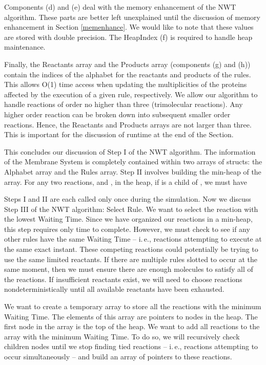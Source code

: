 \documentclass[copyright]{eptcs}
\begin{document}
Components (d) and (e) deal with the memory enhancement of the NWT algorithm.  These parts are better left unexplained until the discussion of memory enhancement in Section \ref{memenhance}.  We would like to note that these values are stored with double precision.  The HeapIndex (f) is required to handle heap maintenance.

Finally, the Reactants array and the Products array (components (g) and (h)) contain the indices of the alphabet for the reactants and products of the rules.  This allows O(1) time access when updating the multiplicities of the proteins affected by the execution of a given rule, respectively.  We allow our algorithm to handle reactions of order no higher than three (trimolecular reactions).  Any higher order reaction can be broken down into subsequent smaller order reactions.  Hence, the Reactants and Products arrays are not larger than three.  This is important for the discussion of runtime at the end of the Section.

This concludes our discussion of Step I of the NWT algorithm.  The information of the Membrane System is completely contained within two arrays of structs: the Alphabet array and the Rules array.  Step II involves building the min-heap of the array.  For any two reactions,  and , in the heap, if  is a child of , we must have


Steps I and II are each called only once during the simulation.  Now we discuss Step III of the NWT algorithm: Select Rule.  We want to select the reaction with the lowest Waiting Time.  Since we have organized our reactions in a min-heap, this step requires only  time to complete.  However, we must check to see if any other rules have the same Waiting Time -- i.\,e., reactions attempting to execute at the same exact instant.  These competing reactions could potentially be trying to use the same limited reactants.  If there are multiple rules slotted to occur at the same moment, then we must ensure there are enough molecules to satisfy all of the reactions.  If insufficient reactants exist, we will need to choose reactions nondeterministically until all available reactants have been exhausted.

We want to create a temporary array to store all the reactions with the minimum Waiting Time.  The elements of this array are pointers to nodes in the heap.  The first node in the array is the top of the heap.  We want to add all reactions to the array with the minimum Waiting Time.  To do so, we will recursively check children nodes until we stop finding tied reactions -- i.\,e., reactions attempting to occur simultaneously -- and build an array of pointers to these reactions.  
\end{document}
